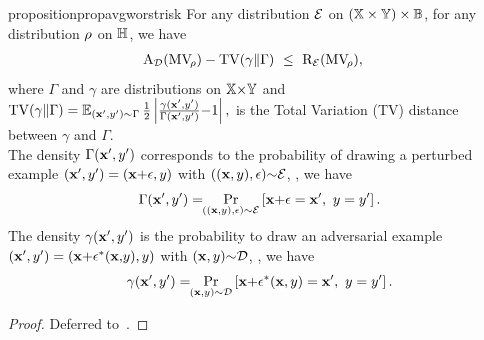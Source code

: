 \begin{restatable}{proposition}{propavgworstrisk}\label{chap:mv-robustness:proposition:avg-worst-risk}
For any  distribution ${\mathcal{E}}$ on $(\mathbb{X}\times\mathbb{Y})\times\mathbb{B}$, for any distribution $\rho$ on $\mathbb{H}$, we have
\begin{align*}
    &\RiskA_{\D}(\MVQ) - \TV(\gamma\|\Gamma)\ \le\  \Risk_{\Dpert}(\MVQ),
\end{align*}
where $\Gamma$ and $\gamma$ are distributions on $\mathbb{X}{\times}\mathbb{Y}$ and ${\rm TV}(\gamma\|\Gamma) = \operatorname*{\mathbb{E}}_{(\mathbf{x}', y')\sim\Gamma}\frac{1}{2}\left\vert\frac{\gamma(\mathbf{x}'{,}y')}{\Gamma(\mathbf{x}'{,}y')}{-}1\right\vert,$
is the Total Variation (TV) distance between $\gamma$ and $\Gamma$.\\
The density $\Gamma(\mathbf{x}',y')$ corresponds to the probability of drawing a perturbed example $(\mathbf{x}', y')= (\mathbf{x}{+}\epsilon, y)$ with ${((\mathbf{x},y),\epsilon){\sim}{\mathcal{E}}}$, \ie, we have
\begin{align*}
\Gamma(\mathbf{x}', y') = \!\!\Pr_{((\mathbf{x},y),\epsilon){\sim}{\mathcal{E}}}\left[ \mathbf{x}{+}\epsilon=\mathbf{x}',\  y=y'\right].
\end{align*}
The density $\gamma(\mathbf{x}',y')$ is the probability to draw an adversarial example $(\mathbf{x}', y')=(\mathbf{x}{+}\epsilon^*(\mathbf{x}{,}y),y)$ with $(\mathbf{x},y){\sim}\mathcal{D}$, \ie, we have
\begin{align*}
\gamma(\mathbf{x}', y') =\!\! \Pr_{(\mathbf{x},y)\sim\mathcal{D}}\left[ \mathbf{x}{+}\epsilon^*(\mathbf{x},y)=\mathbf{x}',\  y=y'\right].
\end{align*}
\end{restatable}
\begin{noaddcontents}\begin{proof}
Deferred to~.
\end{proof}\end{noaddcontents}

